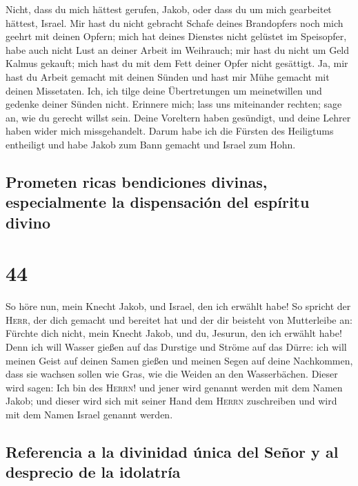  Nicht, dass du mich hättest gerufen, Jakob, oder dass du
um mich gearbeitet hättest, Israel.  Mir hast du nicht
gebracht Schafe deines Brandopfers noch mich geehrt mit deinen Opfern;
mich hat deines Dienstes nicht gelüstet im Speisopfer, habe auch nicht
Lust an deiner Arbeit im Weihrauch;  mir hast du nicht um
Geld Kalmus gekauft; mich hast du mit dem Fett deiner Opfer nicht
gesättigt. Ja, mir hast du Arbeit gemacht mit deinen Sünden und hast mir
Mühe gemacht mit deinen Missetaten.  Ich, ich tilge deine
Übertretungen um meinetwillen und gedenke deiner Sünden nicht.
 Erinnere mich; lass uns miteinander rechten; sage an,
wie du gerecht willst sein.  Deine Voreltern haben
gesündigt, und deine Lehrer haben wider mich missgehandelt.
 Darum habe ich die Fürsten des Heiligtums entheiligt und
habe Jakob zum Bann gemacht und Israel zum Hohn.

\hypertarget{prometen-ricas-bendiciones-divinas-especialmente-la-dispensaciuxf3n-del-espuxedritu-divino}{%
\subsection{Prometen ricas bendiciones divinas, especialmente la
dispensación del espíritu
divino}\label{prometen-ricas-bendiciones-divinas-especialmente-la-dispensaciuxf3n-del-espuxedritu-divino}}

\hypertarget{section-43}{%
\section{44}\label{section-43}}

 So höre nun, mein Knecht Jakob, und Israel, den ich
erwählt habe!  So spricht der \textsc{Herr}, der dich
gemacht und bereitet hat und der dir beisteht von Mutterleibe an:
Fürchte dich nicht, mein Knecht Jakob, und du, Jesurun, den ich erwählt
habe!  Denn ich will Wasser gießen auf das Durstige und
Ströme auf das Dürre: ich will meinen Geist auf deinen Samen gießen und
meinen Segen auf deine Nachkommen,  dass sie wachsen
sollen wie Gras, wie die Weiden an den Wasserbächen. 
Dieser wird sagen: Ich bin des \textsc{Herrn}! und jener wird genannt
werden mit dem Namen Jakob; und dieser wird sich mit seiner Hand dem
\textsc{Herrn} zuschreiben und wird mit dem Namen Israel genannt werden.

\hypertarget{referencia-a-la-divinidad-uxfanica-del-seuxf1or-y-al-desprecio-de-la-idolatruxeda}{%
\subsection{Referencia a la divinidad única del Señor y al desprecio de
la
idolatría}\label{referencia-a-la-divinidad-uxfanica-del-seuxf1or-y-al-desprecio-de-la-idolatruxeda}}

